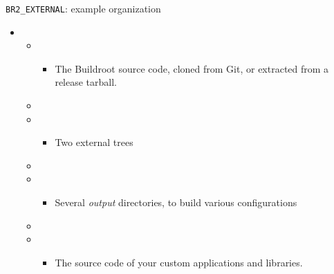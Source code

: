 \begin{frame}{{\tt BR2\_EXTERNAL}: example organization}

  \begin{itemize}
  \item {}
    \begin{itemize}
    \item {}
      \begin{itemize}
      \item The Buildroot source code, cloned from Git, or extracted
        from a release tarball.
      \end{itemize}
    \item {}
    \item {}
      \begin{itemize}
      \item Two external trees
      \end{itemize}
    \item {}
    \item {}
      \begin{itemize}
      \item Several {\em output} directories, to build various configurations
      \end{itemize}
    \item {}
    \item {}
      \begin{itemize}
      \item The source code of your custom applications and libraries.
      \end{itemize}
    \end{itemize}
  \end{itemize}
\end{frame}

